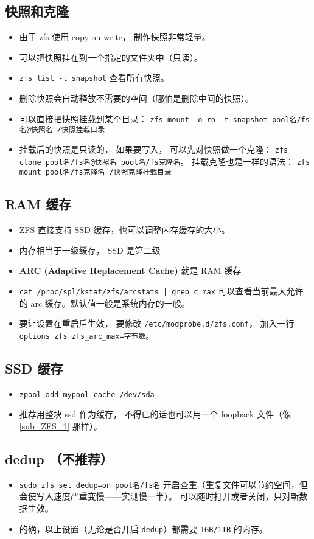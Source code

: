 \subsection{快照和克隆}
\begin{itemize}
\item 由于 zfs 使用 copy-on-write， 制作快照非常轻量。
\item 可以把快照挂在到一个指定的文件夹中（只读）。
\item \verb|zfs list -t snapshot| 查看所有快照。
\item 删除快照会自动释放不需要的空间（哪怕是删除中间的快照）。
\item 可以直接把快照挂载到某个目录： \verb|zfs mount -o ro -t snapshot pool名/fs名@快照名 /快照挂载目录|
\item 挂载后的快照是只读的， 如果要写入， 可以先对快照做一个克隆： \verb|zfs clone pool名/fs名@快照名 pool名/fs克隆名|。 挂载克隆也是一样的语法： \verb|zfs mount pool名/fs克隆名 /快照克隆挂载目录|
\end{itemize}

\subsection{RAM 缓存}
\begin{itemize}
\item ZFS 直接支持 SSD 缓存，也可以调整内存缓存的大小。
\item 内存相当于一级缓存， SSD 是第二级
\item \textbf{ARC (Adaptive Replacement Cache) }就是 RAM 缓存
\item \verb`cat /proc/spl/kstat/zfs/arcstats | grep c_max` 可以查看当前最大允许的 arc 缓存。默认值一般是系统内存的一般。
\item 要让设置在重启后生效， 要修改 \verb`/etc/modprobe.d/zfs.conf`， 加入一行 \verb`options zfs zfs_arc_max=字节数`。 
\end{itemize}

\subsection{SSD 缓存}
\begin{itemize}
\item \verb`zpool add mypool cache /dev/sda`
\item 推荐用整块 ssd 作为缓存， 不得已的话也可以用一个 loopback 文件（像\autoref{sub_ZFS_1} 那样）。
\end{itemize}

\subsection{dedup （不推荐）}
\begin{itemize}
\item \verb|sudo zfs set dedup=on pool名/fs名| 开启查重（重复文件可以节约空间，但会使写入速度严重变慢——实测慢一半）。 可以随时打开或者关闭，只对新数据生效。
\item 的确，以上设置（无论是否开启 \verb|dedup|）都需要 \verb|1GB/1TB| 的内存。
\end{itemize}

